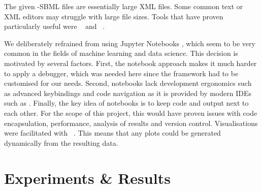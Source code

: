 \documentclass[
	fontsize=10pt, %
	twoside=true, %
	secnumdepth=1, %
  toc=indentunnumbered %
]{kaobook}
\begin{document}
The given -SBML files are essentially large XML files.
Some common text or XML editors may struggle with large file sizes. Tools that
have proven particularly useful were
~\cite{_XmlExplorer_2021} and ~\cite{_GNUEmacsGNU_}.

We deliberately refrained from using Jupyter Notebooks
\cite{kluyver_JupyterNotebooksPublishing_2016}, which seem to be very common in
the fields of machine learning and data science. This decision is motivated by
several factors. First, the notebook approach makes it much harder to apply a
debugger, which was needed here since the  framework had to
be customised for our needs. Second, notebooks lack development ergonomics such
as advanced keybindings and code navigation as it is provided by modern IDEs
such as . Finally, the key idea of notebooks is to keep code and
output next to each other. For the scope of this project, this would have proven
issues with code encapsulation, performance, analysis of results and version
control.
Visualisations were facilitated with
~\cite{caswell_MatplotlibMatplotlibREL_2021}. This means that
any plots could be generated dynamically from the resulting data.







% 



\chapter{Experiments \& Results}
\label{sec:experiments-results}
\end{document}
